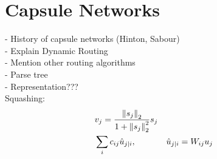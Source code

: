 
\section{Capsule Networks}
- History of capsule networks (Hinton, Sabour) \\
- Explain Dynamic Routing \\
- Mention other routing algorithms \\
- Parse tree \\
- Representation??? \\

Squashing:
\begin{equation}
\begin{aligned}
& v_j = \frac{\left \lVert s_j \right \rVert _2}{1 + \left \lVert s_j \right \rVert _2^2} s_j \\
& \sum_{i} c_{ij} \hat{u}_{j \vert i}, & & \hat{u}_{j \vert i} = W_{ij}u_j
\end{aligned}
\end{equation}